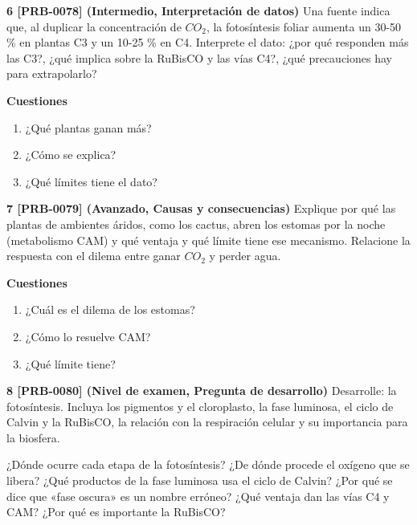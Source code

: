 \documentclass{book}
\begin{document}
\begin{tcolorbox}[title={Ejercicios}, studiumworked, breakable]
\noindent\textbf{6 [PRB-0078] (Intermedio, Interpretación de datos)}
Una fuente indica que, al duplicar la concentración de \(CO_{2}\), la fotosíntesis foliar aumenta un 30-50 \% en plantas C3 y un 10-25 \% en C4. Interprete el dato: ¿por qué responden más las C3?, ¿qué implica sobre la RuBisCO y las vías C4?, ¿qué precauciones hay para extrapolarlo?


\noindent\textbf{Cuestiones}
\begin{enumerate}
\item ¿Qué plantas ganan más?
\item ¿Cómo se explica?
\item ¿Qué límites tiene el dato?
\end{enumerate}

\noindent\textbf{7 [PRB-0079] (Avanzado, Causas y consecuencias)}
Explique por qué las plantas de ambientes áridos, como los cactus, abren los estomas por la noche (metabolismo CAM) y qué ventaja y qué límite tiene ese mecanismo. Relacione la respuesta con el dilema entre ganar \(CO_{2}\) y perder agua.


\noindent\textbf{Cuestiones}
\begin{enumerate}
\item ¿Cuál es el dilema de los estomas?
\item ¿Cómo lo resuelve CAM?
\item ¿Qué límite tiene?
\end{enumerate}

\noindent\textbf{8 [PRB-0080] (Nivel de examen, Pregunta de desarrollo)}
Desarrolle: la fotosíntesis. Incluya los pigmentos y el cloroplasto, la fase luminosa, el ciclo de Calvin y la RuBisCO, la relación con la respiración celular y su importancia para la biosfera.

\end{tcolorbox}

\begin{tcolorbox}[title={Autoficha}, studiumcheck, breakable]

¿Dónde ocurre cada etapa de la fotosíntesis? ¿De dónde procede el oxígeno que se libera? ¿Qué productos de la fase luminosa usa el ciclo de Calvin? ¿Por qué se dice que «fase oscura» es un nombre erróneo? ¿Qué ventaja dan las vías C4 y CAM? ¿Por qué es importante la RuBisCO?

\end{tcolorbox}
\end{document}
